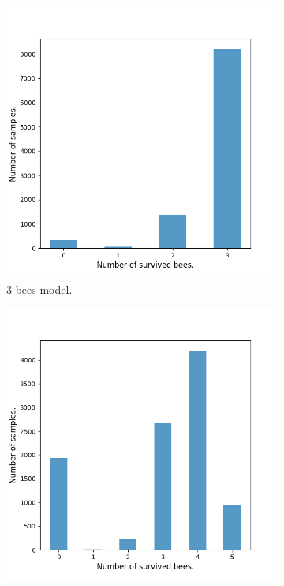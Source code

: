 \begin{figure}[H]
    \centering
    \begin{subfigure}{0.32\textwidth}
        \centering
        \includegraphics[width=\linewidth]{figures/bee_3_data.png}
        \caption{3 bees model.}
    \end{subfigure}
    \hfill
    \begin{subfigure}{0.32\textwidth}
        \centering
        \includegraphics[width=\linewidth]{figures/bee_5_data.png}

\end{subfigure}
\end{figure}

